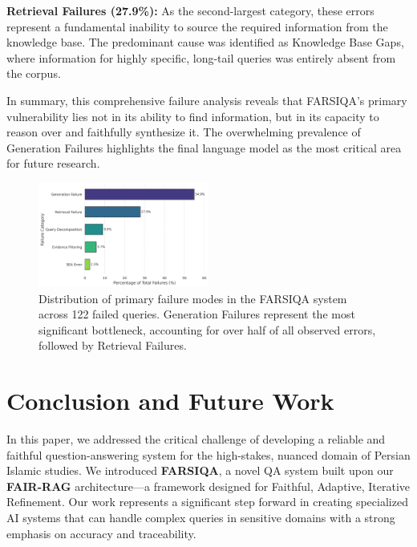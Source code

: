 \documentclass[11pt]{article}
\begin{document}
\textbf{Retrieval Failures (27.9\%):} As the second-largest category, these errors represent a fundamental inability to source the required information from the knowledge base. The predominant cause was identified as Knowledge Base Gaps, where information for highly specific, long-tail queries was entirely absent from the corpus.

In summary, this comprehensive failure analysis reveals that FARSIQA's primary vulnerability lies not in its ability to find information, but in its capacity to reason over and faithfully synthesize it. The overwhelming prevalence of Generation Failures highlights the final language model as the most critical area for future research.

\begin{figure}[t]
\centering
\includegraphics[width=0.5\textwidth]{figure_7.png}
\caption{Distribution of primary failure modes in the FARSIQA system across 122 failed queries. Generation Failures represent the most significant bottleneck, accounting for over half of all observed errors, followed by Retrieval Failures.}
\label{fig:failure-modes}
\end{figure}

\section{Conclusion and Future Work}

In this paper, we addressed the critical challenge of developing a reliable and faithful question-answering system for the high-stakes, nuanced domain of Persian Islamic studies. We introduced \textbf{FARSIQA}, a novel QA system built upon our \textbf{FAIR-RAG} architecture---a framework designed for Faithful, Adaptive, Iterative Refinement. Our work represents a significant step forward in creating specialized AI systems that can handle complex queries in sensitive domains with a strong emphasis on accuracy and traceability.
\end{document}
